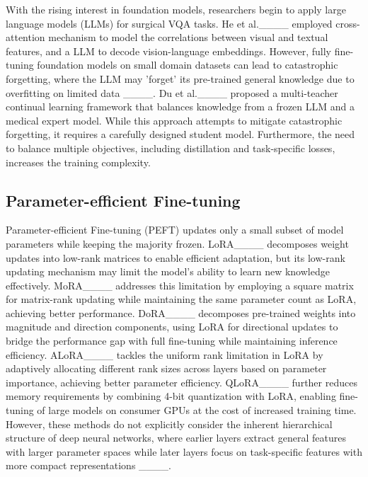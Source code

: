 With the rising interest in foundation models, researchers begin to apply large language models (LLMs) for surgical VQA tasks. He et al.____ employed cross-attention mechanism to model the correlations between visual and textual features, and a LLM to decode vision-language embeddings. However, fully fine-tuning foundation models on small domain datasets can lead to catastrophic forgetting, where the LLM may 'forget' its pre-trained general knowledge due to overfitting on limited data ____. Du et al.____ proposed a multi-teacher continual learning framework that balances knowledge from a frozen LLM and a medical expert model. While this approach attempts to mitigate catastrophic forgetting, it requires a carefully designed student model. Furthermore, the need to balance multiple objectives, including distillation and task-specific losses, increases the training complexity.

\subsection{Parameter-efficient Fine-tuning}
Parameter-efficient Fine-tuning (PEFT) updates only a small subset of model parameters while keeping the majority frozen. LoRA____ decomposes weight updates into low-rank matrices to enable efficient adaptation, but its low-rank updating mechanism may limit the model's ability to learn new knowledge effectively. MoRA____ addresses this limitation by employing a square matrix for matrix-rank updating while maintaining the same parameter count as LoRA, achieving better performance. DoRA____ decomposes pre-trained weights into magnitude and direction components, using LoRA for directional updates to bridge the performance gap with full fine-tuning while maintaining inference efficiency. ALoRA____ tackles the uniform rank limitation in LoRA by adaptively allocating different rank sizes across layers based on parameter importance, achieving better parameter efficiency. QLoRA____ further reduces memory requirements by combining 4-bit quantization with LoRA, enabling fine-tuning of large models on consumer GPUs at the cost of increased training time. However, these methods do not explicitly consider the inherent hierarchical structure of deep neural networks, where earlier layers extract general features with larger parameter spaces while later layers focus on task-specific features with more compact representations ____.
